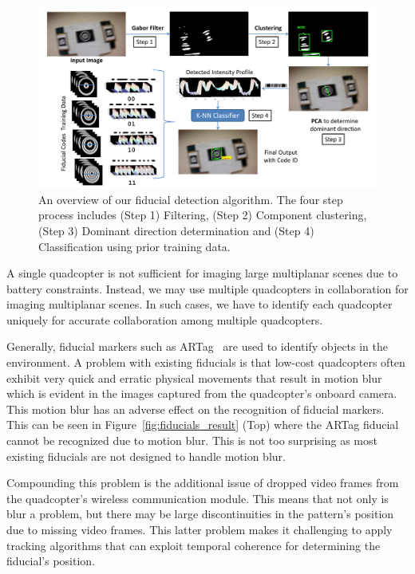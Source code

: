 \begin{figure}[h!]
\centering
\includegraphics[width=0.98\linewidth]{figures/fiducial/overall_flow}
\caption[Overall Workflow of blur resilient fiducial detection algorithm]{An
overview of our fiducial detection algorithm.
    The four step process includes (Step 1) Filtering,
    (Step 2) Component clustering, (Step 3) Dominant direction determination
    and (Step 4) Classification using prior training data.}
 \label{fig:fiducial_workflow}
\end{figure}

A single quadcopter is not sufficient for imaging large multiplanar scenes due
to battery constraints. Instead, we may use multiple quadcopters in
collaboration for imaging multiplanar scenes. In such cases, we have to identify
each quadcopter uniquely for accurate collaboration among multiple quadcopters. 

Generally, fiducial markers such as ARTag~\cite{Fiala05} are used to identify
objects in the environment. A problem with existing fiducials is that low-cost
quadcopters often exhibit very quick and erratic physical movements that result
in motion blur which is evident in the images captured from the quadcopter's
onboard camera. This motion blur has an adverse effect on the recognition of fiducial
markers. This can be seen in Figure~\ref{fig:fiducials_result} (Top) where the
ARTag fiducial cannot be recognized due to motion blur. This is not too
surprising as most existing fiducials are not designed to handle motion blur.

Compounding this problem is the additional issue of dropped video
frames from the quadcopter's wireless communication module. This means
that not only is blur a problem, but there may be large
discontinuities in the pattern's position due to missing video
frames. This latter problem makes it challenging to apply tracking algorithms
that can exploit temporal coherence for determining the fiducial's position.

